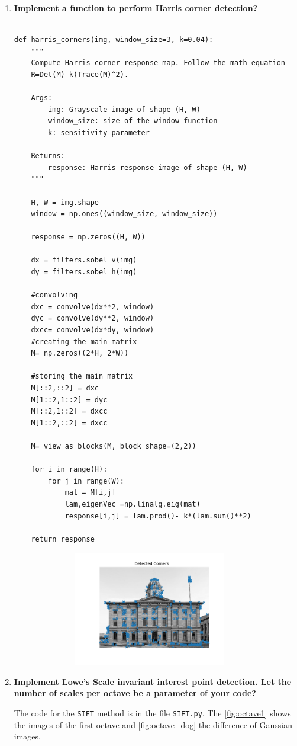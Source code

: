 \documentclass[a4paper, nobib]{tufte-handout}
\begin{document}
\begin{enumerate}
  \item \textbf{Implement a function to perform \textbf{Harris corner}
    detection?}
      \begin{verbatim}

def harris_corners(img, window_size=3, k=0.04):
    """
    Compute Harris corner response map. Follow the math equation
    R=Det(M)-k(Trace(M)^2).
        
    Args:
        img: Grayscale image of shape (H, W)
        window_size: size of the window function
        k: sensitivity parameter

    Returns:
        response: Harris response image of shape (H, W)
    """

    H, W = img.shape
    window = np.ones((window_size, window_size))

    response = np.zeros((H, W))

    dx = filters.sobel_v(img)
    dy = filters.sobel_h(img)

    #convolving 
    dxc = convolve(dx**2, window)
    dyc = convolve(dy**2, window)
    dxcc= convolve(dx*dy, window) 
    #creating the main matrix
    M= np.zeros((2*H, 2*W))
    
    #storing the main matrix
    M[::2,::2] = dxc
    M[1::2,1::2] = dyc
    M[::2,1::2] = dxcc 
    M[1::2,::2] = dxcc
    
    M= view_as_blocks(M, block_shape=(2,2))

    for i in range(H):
        for j in range(W):
            mat = M[i,j]
            lam,eigenVec =np.linalg.eig(mat)
            response[i,j] = lam.prod()- k*(lam.sum()**2)

    return response

    \end{verbatim}
  \begin{figure}[ht!]
  \centering
  \includegraphics[width=10cm, height=5cm]{./harris_response.png}
\end{figure}

\item \textbf{Implement Lowe's Scale invariant interest point detection. Let the
  number of scales per octave be a parameter of your code?}

  The code for the \texttt{SIFT} method is in the file
  \texttt{SIFT.py}. The \autoref{fig:octave1} shows the images of
  the first octave and \autoref{fig:octave_dog} the difference of Gaussian
  images.

\end{enumerate}
\end{document}
